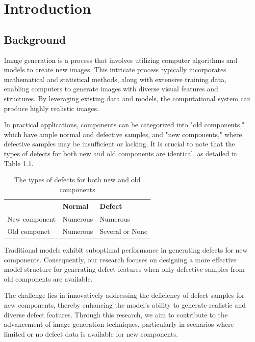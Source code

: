 \chapter{Introduction}
\label{chapter:intro}


\section{Background}
Image generation is a process that involves utilizing computer algorithms and models to create new images. This intricate process typically incorporates mathematical and statistical methods, along with extensive training data, enabling computers to generate images with diverse visual features and structures. By leveraging existing data and models, the computational system can produce highly realistic images.

In practical applications, components can be categorized into "old components," which have ample normal and defective samples, and "new components," where defective samples may be insufficient or lacking. It is crucial to note that the types of defects for both new and old components are identical, as detailed in Table 1.1.
\renewcommand{\arraystretch}{1.5} %
\setlength{\tabcolsep}{10pt} %

\begin{table}[h]
    \centering
    \begin{tabular}{lll} \hline  
         &  Normal& Defect\\ \hline  
         New component&  Numerous& Numerous\\ \hline  
         Old componet&Numerous&Several or None\\ \hline 
    \end{tabular}
    \caption{The types of defects for both new and old components}
    \label{tab:my_label}
\end{table}
Traditional models exhibit suboptimal performance in generating defects for new components. Consequently, our research focuses on designing a more effective model structure for generating defect features when only defective samples from old components are available.

The challenge lies in innovatively addressing the deficiency of defect samples for new components, thereby enhancing the model's ability to generate realistic and diverse defect features. Through this research, we aim to contribute to the advancement of image generation techniques, particularly in scenarios where limited or no defect data is available for new components.



